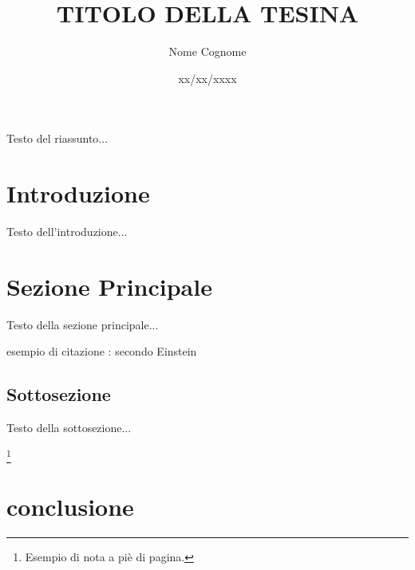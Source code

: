 \documentclass[a4paper,12pt]{article}
\title{\fontsize{14}{17}\bfseries\uppercase{Titolo della Tesina}}
\author{Nome Cognome}
\date{xx/xx/xxxx}
\begin{document}
\maketitle
\thispagestyle{empty}

\begin{center}
    \vspace{1cm}
    \textbf{\fontsize{12}{15}\selectfont{Riassunto}}
\end{center}

Testo del riassunto...

\tableofcontents  


\newpage

\section{Introduzione}
Testo dell'introduzione...

\section{Sezione Principale}
Testo della sezione principale...

esempio di citazione : secondo Einstein \cite{einstein1905}
\subsection{Sottosezione}
Testo della sottosezione...

\footnote{Esempio di nota a piè di pagina.}

\section{conclusione}

\newpage %


\end{document}
